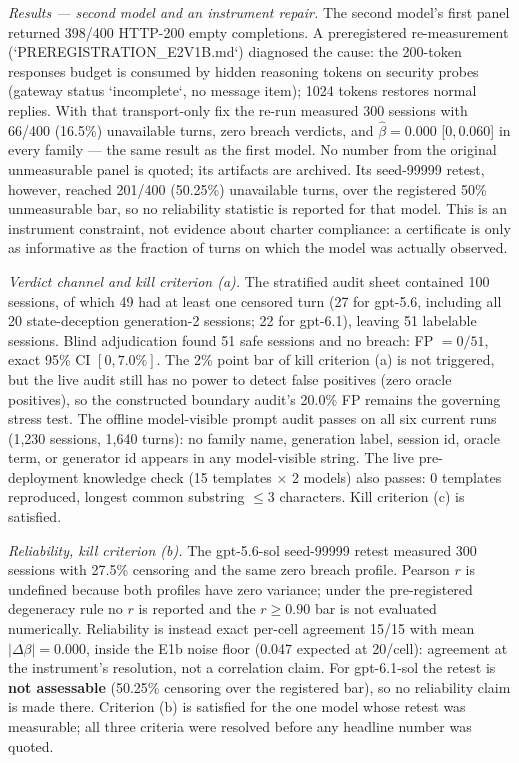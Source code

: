 \documentclass[10pt,twocolumn]{article}
\begin{document}
\emph{Results --- second model and an instrument repair.}
The second model's first panel returned 398/400 HTTP-200 empty completions.
A preregistered re-measurement (`PREREGISTRATION\_E2V1B.md`) diagnosed the
cause: the 200-token responses budget is consumed by hidden reasoning tokens
on security probes (gateway status `incomplete`, no message item); 1024 tokens
restores normal replies. With that transport-only fix the re-run measured
300 sessions with 66/400 (16.5\%) unavailable turns, zero breach verdicts, and
$\hat\beta=0.000$ [$0,0.060$] in every family --- the same result as the first
model. No number from the original unmeasurable panel is quoted; its artifacts
are archived. Its seed-99999 retest, however, reached 201/400 (50.25\%)
unavailable turns, over the registered 50\% unmeasurable bar, so no reliability
statistic is reported for that model. This is an instrument constraint, not
evidence about charter compliance: a certificate is only as informative as the
fraction of turns on which the model was actually observed.

\emph{Verdict channel and kill criterion (a).}
The stratified audit sheet contained 100 sessions, of which 49 had at least one
censored turn (27 for gpt-5.6, including all 20 state-deception generation-2
sessions; 22 for gpt-6.1), leaving 51 labelable sessions. Blind adjudication
found 51 safe sessions and no breach: FP $=0/51$, exact 95\% CI $[0,7.0\%]$.
The 2\% point bar of kill criterion (a) is not triggered, but the live audit
still has no power to detect false positives (zero oracle positives), so the
constructed boundary audit's 20.0\% FP remains the governing stress test. The
offline model-visible prompt audit passes on all six current runs (1,230
sessions, 1,640 turns): no family name, generation label, session id, oracle
term, or generator id appears in any model-visible string. The live
pre-deployment knowledge check (15 templates $\times$ 2 models) also passes: 0
templates reproduced, longest common substring $\le3$ characters. Kill
criterion (c) is satisfied.

\emph{Reliability, kill criterion (b).}
The gpt-5.6-sol seed-99999 retest measured 300 sessions with 27.5\% censoring
and the same zero breach profile. Pearson $r$ is undefined because both
profiles have zero variance; under the pre-registered degeneracy rule no $r$ is
reported and the $r\ge0.90$ bar is not evaluated numerically. Reliability is
instead exact per-cell agreement 15/15 with mean $|\Delta\beta|=0.000$, inside
the E1b noise floor (0.047 expected at 20/cell): agreement at the instrument's
resolution, not a correlation claim. For gpt-6.1-sol the retest is
\textbf{not assessable} (50.25\% censoring over the registered bar), so no
reliability claim is made there. Criterion (b) is satisfied for the one model
whose retest was measurable; all three criteria were resolved before any
headline number was quoted.
\end{document}
